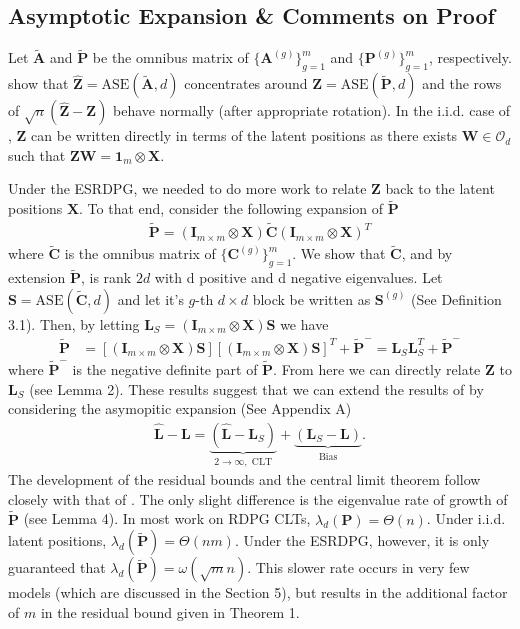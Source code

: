 \documentclass{article}
\newcommand{\bvar}[1]{\mathbf{#1}}
\theoremstyle{definition}
\numberwithin{Def}{section}
\begin{document}
\subsection{Asymptotic Expansion \& Comments on Proof}

Let $\tilde{\bvar{A}}$ and $\tilde{\bvar{P}}$ be the omnibus matrix of $\{\bvar{A}^{(g)}\}_{g=1}^m$ and $\{\bvar{P}^{(g)}\}_{g=1}^m$, respectively.
\textcite{OmniCLT} show that $\hat{\bvar{Z}} = \text{ASE}(\tilde{\bvar{A}}, d)$ concentrates around $\bvar{Z} = \text{ASE}(\tilde{\bvar{P}}, d)$ and the rows of $\sqrt{n}(\hat{\bvar{Z}} - \bvar{Z})$ behave normally (after appropriate rotation).
In the i.i.d. case of \textcite{OmniCLT}, $\bvar{Z}$ can be written directly in terms of the latent positions as there exists $\bvar{W}\in \mathcal{O}_d$ such that $\bvar{ZW} = \bvar{1}_m\otimes \bvar{X}$. 

Under the ESRDPG, we needed to do more work to relate $\bvar{Z}$ back to the latent positions $\bvar{X}$. 
To that end, consider the following expansion of $\tilde{\bvar{P}}$
\begin{align*}
    \tilde{\bvar{P}} = (\bvar{I}_{m\times m}\otimes\bvar{X})\tilde{\bvar{C}}(\bvar{I}_{m\times m}\otimes \bvar{X})^T
\end{align*}
where $\tilde{\bvar{C}}$ is the omnibus matrix of $\{\bvar{C}^{(g)}\}_{g=1}^m$.
We show that $\tilde{\bvar{C}}$, and by extension $\tilde{\bvar{P}}$, is rank $2d$ with d positive and d negative eigenvalues. 
Let $\bvar{S} = \text{ASE}(\tilde{\bvar{C}}, d)$ and let it's $g$-th $d\times d$ block be written as $\bvar{S}^{(g)}$ (See Definition 3.1). 
Then, by letting $\bvar{L}_S = (\bvar{I}_{m\times m}\otimes \bvar{X})\bvar{S}$ we have 
\begin{align*}
\tilde{\bvar{P}} &= [(\bvar{I}_{m\times m}\otimes \bvar{X})\bvar{S}][(\bvar{I}_{m\times m}\otimes \bvar{X})\bvar{S}]^T + \bvar{\tilde{P}}^-= \bvar{L}_S\bvar{L}_S^T + \tilde{\bvar{P}}^-
\end{align*}
where $\tilde{\bvar{P}}^-$ is the negative definite part of $\tilde{\bvar{P}}$.
From here we can directly relate $\bvar{Z}$ to $\bvar{L}_S$ (see Lemma 2).  
These results suggest that we can extend the results of \textcite{OmniCLT} by considering the asymopitic expansion (See Appendix A) 
\begin{align*}
\hat{\bvar{L}} - \bvar{L} = \underbrace{(\hat{\bvar{L}} - \bvar{L}_S)}_{2\to\infty, \text{ CLT}} + \underbrace{(\bvar{L}_S - \bvar{L})}_{\text{Bias}}.
\end{align*}
The development of the residual bounds and the central limit theorem follow closely with that of \textcite{OmniCLT}. 
The only slight difference is the eigenvalue rate of growth of $\tilde{\bvar{P}}$ (see Lemma 4).
In most work on RDPG CLTs, $\lambda_d(\bvar{P}) = \Theta(n)$. 
Under i.i.d. latent positions, $\lambda_d(\tilde{\bvar{P}}) = \Theta(nm)$. 
Under the ESRDPG, however, it is only guaranteed that $\lambda_d(\tilde{\bvar{P}}) = \omega(\sqrt{m}n)$. 
This slower rate occurs in very few models (which are discussed in the Section 5), but results in the additional factor of $m$ in the residual bound given in Theorem 1. 
\end{document}
